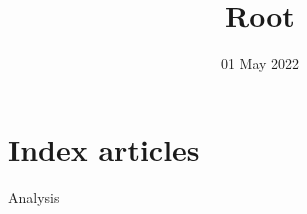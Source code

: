 
\title{Root}
\author{}
\date{01 May 2022}

\maketitle
\section{Index articles}
\begin{description}
    \item[Analysis] 
\end{description}
